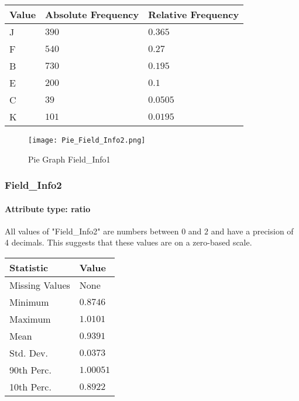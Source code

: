 \begin{table}[H]
	\renewcommand{\arraystretch}{1.25}
	\begin{tabular}{l|l|l}
		\textbf{Value} & \textbf{Absolute Frequency} & \textbf{Relative Frequency}\\\hline
			J&$390$ & $0.365$\\\hline
			F&$540$ & $0.27$\\\hline
			B&$730$ & $0.195$\\\hline
			E&$200$ & $0.1$\\\hline
			C&$39$ & $0.0505$\\\hline
			K&$101$ & $0.0195$\\
	\end{tabular}
\end{table}

\begin{figure}[H]
	\begin{center}
		\texttt{[image: Pie\_Field\_Info2.png]}
	\end{center}
	\caption{Pie Graph Field\_Info1}
\end{figure}


\subsubsection{Field\_Info2}
\paragraph{Attribute type: ratio}
All values of "Field\_Info2" are numbers between $0$ and $2$ and have a precision of 4 decimals. This suggests that these values are on a zero-based scale.
\begin{table}[H]
	\renewcommand{\arraystretch}{1.25}
	\begin{tabular}{l|l}
		\textbf{Statistic} & \textbf{Value}\\\hline
			Missing Values& None\\\hline
			Minimum& $0.8746$\\\hline
			Maximum& $1.0101$\\\hline
			Mean& $0.9391$\\\hline
			Std. Dev.& $0.0373$\\\hline
			90th Perc. & $1.00051$\\\hline
			10th Perc. & $0.8922$ \\
	\end{tabular}
\end{table}

